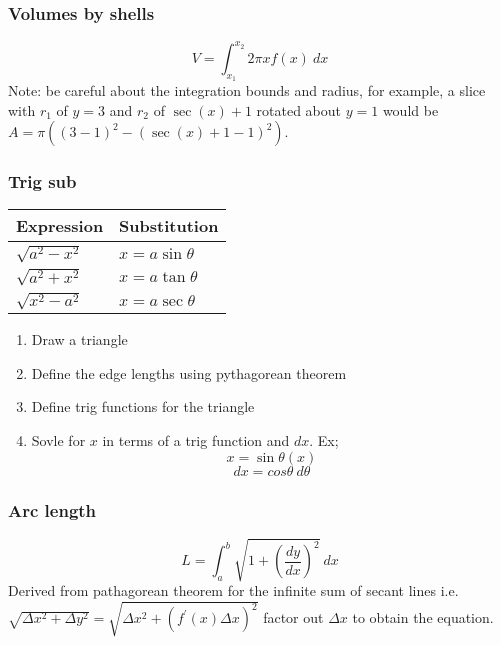 \documentclass{article}
\begin{document}
\begin{multicols}{2}
\subsubsection*{Volumes by shells}
\[
	V = \int_{x_1}^{x_2} 2\pi x f(x)\ dx
\]
Note: be careful about the integration bounds and radius, for example,  a slice with $r_1$ of $y=3$ and $r_2$ of $\sec(x) + 1$ rotated about $y=1$ would be\\ $A = \pi \left( (3-1)^2 - (\sec(x) + 1 - 1)^2 \right)$.

\subsubsection*{Trig sub}
\begin{minipage}{0.2\textwidth}
    \begin{tabular}{|l|l|}
        \hline
        Expression & Substitution\\
        \hline
        $\sqrt{a^2-x^2}$ & $x=a\sin\theta$\\
        $\sqrt{a^2+x^2}$ & $x=a\tan\theta$\\
        $\sqrt{x^2-a^2}$ & $x=a\sec\theta$\\
        \hline
    \end{tabular}
\end{minipage}
\begin{minipage}{0.3\textwidth}
    \begin{enumerate}
	\item Draw a triangle
	\item Define the edge lengths using pythagorean theorem
	\item Define trig functions for the triangle
	\item Sovle for $x$ in terms of a trig function and $dx$. Ex;
		\[
			x = \sin \theta (x)
		\]
		\[
			dx = cos \theta\ d \theta
		\]
    \end{enumerate}
\end{minipage}

\subsubsection*{Arc length}
\[
	L = \int_a^b \sqrt{1 + \left(\frac{dy}{dx}\right)^2}\ dx
\]
Derived from pathagorean theorem for the infinite sum of secant lines i.e. $\sqrt{\Delta x^2 + \Delta y^2} = \sqrt{\Delta x^2 + (f^\prime(x)\Delta x)^2}$ factor out $\Delta x$ to obtain the equation.


\end{multicols}
\end{document}
